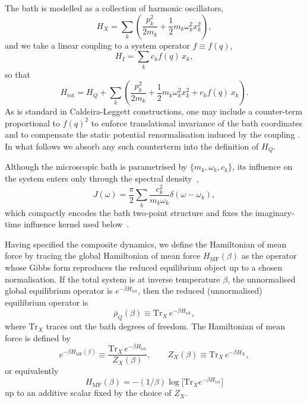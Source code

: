 \documentclass[aps,prl,twocolumn,superscriptaddress,showpacs,floatfix]{revtex4-2}
\newcommand{\Tr}{\mathrm{Tr}}
\begin{document}
The bath is modelled as a collection of harmonic oscillators,
\begin{equation}
    H_X=\sum_k\left(\frac{p_k^2}{2m_k}+\frac{1}{2}m_k\omega_k^2 x_k^2\right),
    \label{eq:HX_model}
\end{equation}
and we take a linear coupling to a system operator $f\equiv f(q)$,
\begin{equation}
    H_I=\sum_k c_k f(q)\, x_k,
    \label{eq:HI_model}
\end{equation}
so that
\begin{equation}
    H_{\mathrm{tot}} = H_Q + \sum_k \left( \frac{p_k^2}{2m_k} + \frac{1}{2}m_k\omega_k^2 x_k^2 + c_k f(q)\, x_k \right).
    \label{eq:Htot_full}
\end{equation}
As is standard in Caldeira-Leggett constructions, one may include a counter-term
proportional to $f(q)^2$ to enforce translational invariance of the bath
coordinates and to compensate the static potential renormalisation induced by
the coupling \cite{caldeiraQuantumTunnellingDissipative1983a}. In what follows we absorb any such counterterm into the
definition of $H_Q$.

Although the microscopic bath is parametrised by $\{m_k,\omega_k,c_k\}$, its
influence on the system enters only through the spectral density~\cite{weissQuantumDissipativeSystems2012, breuerTheoryOpenQuantum2002},
\begin{equation}
    J(\omega) = \frac{\pi}{2} \sum_k \frac{c_k^2}{m_k \omega_k} \delta(\omega-\omega_k),
    \label{eq:spectral_density}
\end{equation}
which compactly encodes the bath two-point structure and fixes the imaginary-time influence kernel used below~\cite{feynmanTheoryGeneralQuantum1963a}.

Having specified the composite dynamics, we define the Hamiltonian of mean force by tracing the global Hamiltonian of mean force $H_{\mathrm{MF}}(\beta)$ as the operator whose Gibbs
form reproduces the reduced equilibrium object up to a chosen normalisation. If
the total system is at inverse temperature $\beta$, the unnormalised global
equilibrium operator is $e^{-\beta H_{\mathrm{tot}}}$, then the reduced
(unnormalised) equilibrium operator is
\begin{equation}
    \bar{\rho}_Q(\beta)\equiv \Tr_X\, e^{-\beta H_{\mathrm{tot}}},
    \label{eq:reduced_equilibrium_operator}
\end{equation}
where $\Tr_X$ traces out the bath degrees of freedom. The Hamiltonian of mean
force is defined by
\begin{equation}
    e^{-\beta H_{\mathrm{MF}}(\beta)}
    \equiv
    \frac{\Tr_X\, e^{-\beta H_{\mathrm{tot}}}}{Z_X(\beta)},
    \qquad
    Z_X(\beta)\equiv \Tr_X\, e^{-\beta H_X},
    \label{eq:HMF_def}
\end{equation}
or equivalently
\begin{equation}
H_{\mathrm{MF}}(\beta)=-(1/\beta)\log\!\big[\Tr_X e^{-\beta H_{\mathrm{tot}}}\big]
\end{equation}
up to an additive scalar fixed by the choice of $Z_X$.
\end{document}
